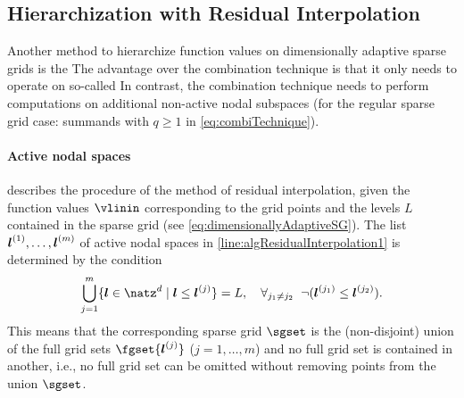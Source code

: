 \subsection{Hierarchization with Residual Interpolation}
\label{sec:433residualInterpolation}

Another method to hierarchize function values on
dimensionally adaptive sparse grids is the
The advantage over the combination technique is that
it only needs to operate on so-called 
In contrast, the combination technique needs to perform computations
on additional non-active nodal subspaces
(for the regular sparse grid case:
summands with $q \ge 1$ in \eqref{eq:combiTechnique}).

\paragraph{Active nodal spaces}

 describes the procedure of
the method of residual interpolation,
given the function values $\vlinin$ corresponding to the grid points
and the levels $L$ contained in the sparse grid
(see \eqref{eq:dimensionallyAdaptiveSG}).
The list ${\boldsymbol{l}}^{(1)}, \dotsc, {\boldsymbol{l}}^{(m)}$ of active nodal spaces
in \cref{line:algResidualInterpolation1} is determined by the condition
\begin{equation}
  \label{eq:activeNodalSpaces}
  \bigcup_{j=1}^m \{\*l \in \natz^d \mid \*l \le \*l^{(j)}\} = L,\quad
  \falarge{j_1 \not= j_2}{\lnot(\*l^{(j_1)} \le \*l^{(j_2)})}.
\end{equation}
This means that the corresponding sparse grid $\sgset$
is the (non-disjoint) union of the full grid sets $\fgset{\*l^{(j)}}$
($j = 1, \dotsc, m$)
and no full grid set is contained in another, i.e.,
no full grid set can be omitted without
removing points from the union $\sgset$.

